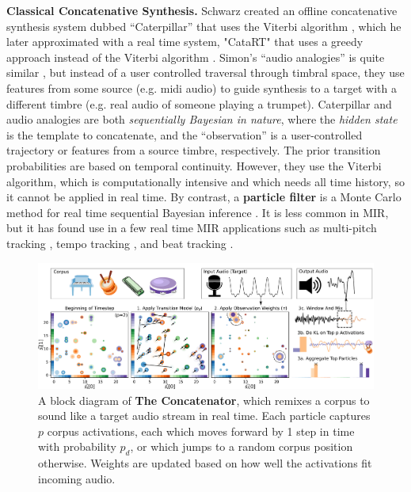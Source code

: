 \documentclass{article}
\begin{document}
\textbf{Classical Concatenative Synthesis.} Schwarz created an offline concatenative synthesis system dubbed ``Caterpillar'' that uses the Viterbi algorithm \cite{schwarz2000system}, which he later approximated with a real time system, "CataRT" that uses a greedy approach instead of the Viterbi algorithm \cite{schwarz2006real, schwarz2008principles}.  Simon's ``audio analogies'' is quite similar \cite{simon2005audio}, but instead of a user controlled traversal through timbral space, they use features from some source (e.g. midi audio) to guide synthesis to a target with a different timbre (e.g. real audio of someone playing a trumpet). Caterpillar and audio analogies are both {\em sequentially Bayesian in nature}, where the {\em hidden state} is the template to concatenate, and the ``observation'' is a user-controlled trajectory or features from a source timbre, respectively.  The prior transition probabilities are based on temporal continuity.  However, they use the Viterbi algorithm, which is computationally intensive and which needs all time history, so it cannot be applied in real time.  By contrast, a \textbf{particle filter} is a Monte Carlo method for real time sequential Bayesian inference \cite{metropolis1949monte, doucet2000sequential, thrun2002probabilistic}.  It is less common in MIR, but it has found use in a few real time MIR applications such as multi-pitch tracking \cite{duan2011state}, tempo tracking \cite{cemgil2003monte, hainsworth2004particle}, and beat tracking \cite{heydari2021don}.  

\begin{figure}[h]
	\centering
	\includegraphics[width=\textwidth]{figs/BlockDGM.pdf}%
	\caption{A block diagram of \textbf{The Concatenator}, which remixes a corpus to sound like a target audio stream in real time.  Each particle captures $p$ corpus activations, each which moves forward by 1 step in time with probability $p_d$, or which jumps to a random corpus position otherwise. Weights are updated based on how well the activations fit incoming audio.   }
	\label{fig:BlockDGM}
\end{figure}
\end{document}
